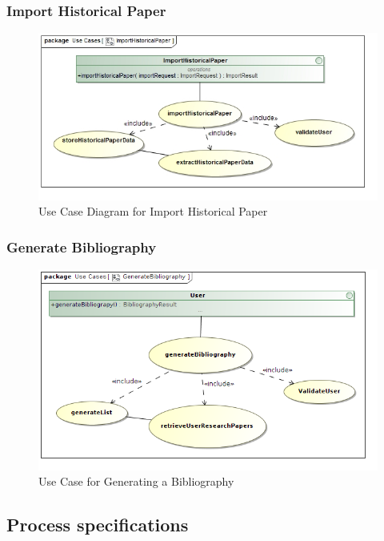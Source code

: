 \documentclass[a4paper,10pt]{article}
\begin{document}
\subsubsection{Import Historical Paper}
	\begin{figure}[H]
		\includegraphics[scale=0.5]{UseImportHistoricalPaper}
		\caption{Use Case Diagram for Import Historical Paper}
	\end{figure}

\subsubsection{Generate Bibliography}
	\begin{figure}[H]
		\includegraphics[scale=0.5]{GenerateBibliographyUse}
	\caption{Use Case for Generating a Bibliography}
	\end{figure}






\subsection{Process specifications}
\end{document}
